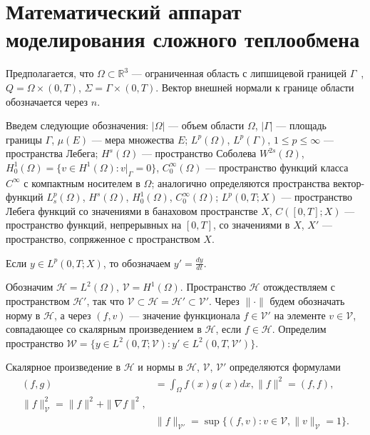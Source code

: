 \section{Математический аппарат моделирования сложного теплообмена}
\label{sec:ch1/sec5}
Предполагается, что $\Omega \subset \mathbb{R}^3$ — ограниченная
область с липшицевой границей $\Gamma$~\cite[с.~232]{Zeidler1986},
$Q = \Omega \times (0, T)$, $\Sigma = \Gamma \times (0, T)$.
Вектор внешней нормали к границе области обозначается через $n$.

Введем следующие обозначения: $|\Omega|$ — объем области $\Omega$,
$|\Gamma|$ — площадь границы $\Gamma$, $\mu(E)$ — мера множества $E$;
$L^p(\Omega)$, $L^p(\Gamma)$, $1 \le p \le \infty$ — пространства Лебега;
$H^s(\Omega)$ — пространство Соболева $W^{2s}(\Omega)$,
$H^1_0(\Omega) = \{v \in H^1(\Omega) : v|_\Gamma = 0\}$,
$C^\infty_0(\Omega)$ — пространство функций класса $C^\infty$
с компактным носителем в $\Omega$; аналогично определяются пространства
вектор-функций $L^p_s(\Omega)$, $H^s(\Omega)$, $H^1_0(\Omega)$,
$C^\infty_0(\Omega)$; $L^p(0, T; X)$ — пространство Лебега функций
со значениями в банаховом пространстве $X$, $C([0, T]; X)$ — пространство
функций, непрерывных на $[0, T]$, со значениями в $X$, $X'$ — пространство,
сопряженное с пространством $X$.

Если $y \in L^p(0, T; X)$, то обозначаем $y' = \frac{dy}{dt}$.

Обозначим $\mathcal{H} = L^2(\Omega)$, $\mathcal{V} = H^1(\Omega)$.
Пространство $\mathcal{H}$ отождествляем с пространством $\mathcal{H}'$,
так что $\mathcal{V} \subset \mathcal{H} = \mathcal{H}' \subset \mathcal{V}'$.
Через $\| \cdot \|$ будем обозначать норму в $\mathcal{H}$,
а через $(f, v)$ — значение функционала $f \in \mathcal{V}'$ на элементе
$v \in \mathcal{V}$, совпадающее со скалярным произведением в $\mathcal{H}$,
если $f \in \mathcal{H}$.
Определим пространство $\mathcal{W} = \{ y \in L^2(0, T; \mathcal{V}):
y' \in L^2(0, T, \mathcal{V}') \}$.

Скалярное произведение в $\mathcal{H}$ и нормы в $\mathcal{H}$,
$\mathcal{V}$, $\mathcal{V}'$ определяются формулами
\begin{align*}
(f, g)
    &= \int_\Omega f(x)g(x) dx, \| f \|^2 = (f, f), \\
    \| f \|^2_{\mathcal{V}} = \| f \|^2 + \| \nabla f \|^2, \\
    & \| f \|_{\mathcal{V}'} = \sup \{ (f, v):
    v \in \mathcal{V}, \|v\|_{\mathcal{V}} = 1 \}.
\end{align*}


